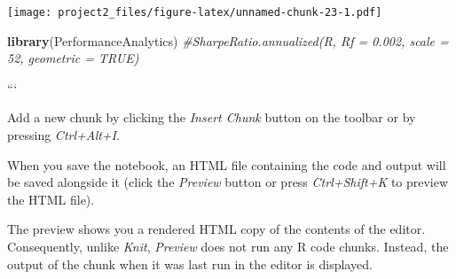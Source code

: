 \documentclass[
]{article}
\newenvironment{Shaded}{\begin{snugshade}}{\end{snugshade}}
\newcommand{\CommentTok}[1]{\textcolor[rgb]{0.56,0.35,0.01}{\textit{#1}}}
\newcommand{\DataTypeTok}[1]{\textcolor[rgb]{0.13,0.29,0.53}{#1}}
\newcommand{\DecValTok}[1]{\textcolor[rgb]{0.00,0.00,0.81}{#1}}
\newcommand{\KeywordTok}[1]{\textcolor[rgb]{0.13,0.29,0.53}{\textbf{#1}}}
\newcommand{\NormalTok}[1]{#1}
\newcommand{\OperatorTok}[1]{\textcolor[rgb]{0.81,0.36,0.00}{\textbf{#1}}}
\newcommand{\StringTok}[1]{\textcolor[rgb]{0.31,0.60,0.02}{#1}}
\begin{document}
\begin{Shaded}
\end{Shaded}

\texttt{[image: project2\_files/figure-latex/unnamed-chunk-23-1.pdf]}

\begin{Shaded}
\begin{Highlighting}[]
\KeywordTok{library}\NormalTok{(PerformanceAnalytics)}
\CommentTok{#SharpeRatio.annualized(R, Rf = 0.002, scale = 52, geometric = TRUE)}
\end{Highlighting}
\end{Shaded}

```

Add a new chunk by clicking the \emph{Insert Chunk} button on the
toolbar or by pressing \emph{Ctrl+Alt+I}.

When you save the notebook, an HTML file containing the code and output
will be saved alongside it (click the \emph{Preview} button or press
\emph{Ctrl+Shift+K} to preview the HTML file).

The preview shows you a rendered HTML copy of the contents of the
editor. Consequently, unlike \emph{Knit}, \emph{Preview} does not run
any R code chunks. Instead, the output of the chunk when it was last run
in the editor is displayed.
\end{document}

